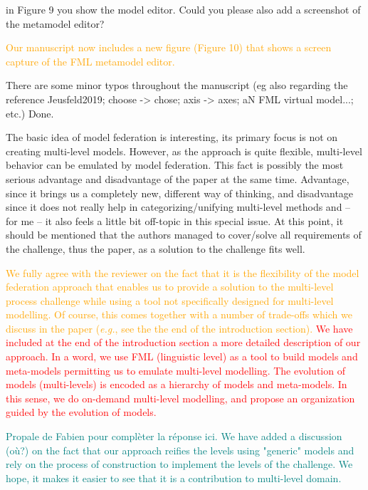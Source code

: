 \documentclass[10pt]{article}
\begin{document}
\begin{response}{in Figure 9 you show the model editor. Could you please also add a screenshot of the metamodel editor?}

\textcolor{orange}{Our manuscript now includes a new figure (Figure 10) that shows a screen capture of the FML metamodel editor.}
\end{response}

\begin{response}{There are some minor typos throughout the manuscript (eg also regarding the reference Jeusfeld2019; choose -> chose; axis -> axes; aN FML virtual model...; etc.)}
Done.
\end{response}


\pagebreak


\begin{response}{The basic idea of model federation is interesting, its primary focus is not on creating multi-level models. However, as the approach is quite flexible, multi-level behavior can be emulated by model federation. This fact is possibly the most serious advantage and disadvantage of the paper at the same time. Advantage, since it brings us a completely new, different way of thinking, and disadvantage since it does not really help in categorizing/unifying multi-level methods and -- for me -- it also feels a little bit off-topic in this special issue. At this point, it should be mentioned that the authors managed to cover/solve all requirements of the challenge, thus the paper, as a solution to the challenge fits well.}

\textcolor{orange}{We fully agree with the reviewer on the fact that it is the flexibility of the model federation approach that enables us to provide a solution to the multi-level process challenge while using a tool not specifically designed for multi-level modelling. Of course, this comes together with a number of trade-offs which we discuss in the paper (\emph{e.g.}, see the the end of the introduction section).}
\textcolor{red}{We have included at the end of the introduction section a more detailed description of our approach. In a word, we use FML (linguistic level) as a tool to build models and meta-models permitting us to emulate multi-level modelling. The evolution of models (multi-levels) is encoded as a hierarchy of models and meta-models. In this sense, we do on-demand multi-level modelling, and propose an organization guided by the evolution of models.}

\textcolor{teal}{Propale de Fabien pour complèter la réponse ici. We have added a discussion (où?) on the fact that our approach reifies the levels using "generic" models and rely on the process of construction to implement the levels of the challenge. We hope, it makes it easier to see that it is a contribution to multi-level domain.}


\end{response}
\end{document}
